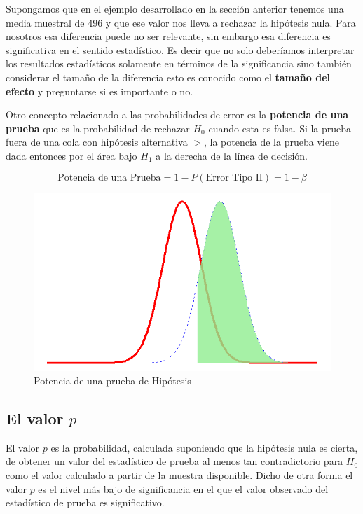 \documentclass[letterpaper,]{book}
\begin{document}
Supongamos que en el ejemplo desarrollado en la sección anterior tenemos una media muestral de 496 y que ese valor nos lleva a rechazar la hipótesis nula. Para nosotros esa diferencia puede no ser relevante, sin embargo esa diferencia es significativa en el sentido estadístico. Es decir que no solo deberíamos interpretar los resultados estadísticos solamente en términos de la significancia sino también considerar el tamaño de la diferencia esto es conocido como el \textbf{tamaño del efecto} y preguntarse si es importante o no.

Otro concepto relacionado a las probabilidades de error es la \textbf{potencia de una prueba} que es la probabilidad de rechazar \(H_0\) cuando esta es falsa. Si la prueba fuera de una cola con hipótesis alternativa \(>\), la potencia de la prueba viene dada entonces por el área bajo \(H_1\) a la derecha de la línea de decisión.

\begin{equation} 
\text{Potencia de una Prueba}=1-P\left(\text{Error Tipo II}\right)=1-\beta
\label{eq:power}
\end{equation}

\begin{figure}[h!]

{\centering \includegraphics[width=0.6\linewidth]{power} 

}

\caption{Potencia de una prueba de Hipótesis}\label{fig:power}
\end{figure}

\hypertarget{pvalor}{%
\subsection{\texorpdfstring{El valor \(p\)}{El valor p}}\label{pvalor}}

El valor \(p\) es la probabilidad, calculada suponiendo que la hipótesis nula es cierta, de obtener un valor del estadístico de prueba al menos tan contradictorio para \(H_0\) como el valor calculado a partir de la muestra disponible. Dicho de otra forma el valor \(p\) es el nivel más bajo de significancia en el que el valor observado del estadístico de prueba es significativo.
\end{document}
